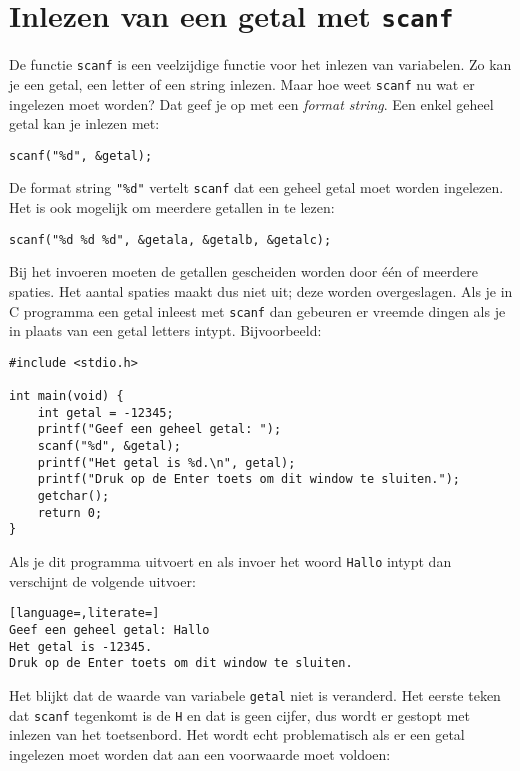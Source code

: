 \documentclass[a4paper,10pt,fleqn,twoside]{article}
\begin{document}
\section{Inlezen van een getal met \texttt{scanf}}
\label{sec:scanf}
De functie \lstinline|scanf| is een veelzijdige functie voor het inlezen van variabelen. Zo kan je een getal, een letter of een string inlezen. Maar hoe weet \lstinline|scanf| nu wat er ingelezen moet worden? Dat geef je op met een \textsl{format string}. Een enkel geheel getal kan je inlezen met:

\begin{lstlisting}
scanf("%d", &getal);
\end{lstlisting}

De format string \lstinline|"%d"| vertelt \lstinline|scanf| dat een geheel getal moet worden ingelezen. Het is ook mogelijk om meerdere getallen in te lezen:

\begin{lstlisting}
scanf("%d %d %d", &getala, &getalb, &getalc);
\end{lstlisting}

Bij het invoeren moeten de getallen gescheiden worden door één of meerdere spaties. Het aantal spaties maakt dus niet uit; deze worden overgeslagen. Als je in C programma een getal inleest met \lstinline|scanf| dan gebeuren er vreemde dingen als je in plaats van een getal letters intypt. Bijvoorbeeld:

\begin{lstlisting}
#include <stdio.h>

int main(void) {
    int getal = -12345;
    printf("Geef een geheel getal: ");
    scanf("%d", &getal);
    printf("Het getal is %d.\n", getal);
    printf("Druk op de Enter toets om dit window te sluiten.");
    getchar();
    return 0;
}
\end{lstlisting}

Als je dit programma uitvoert en als invoer het woord \lstinline|Hallo| intypt dan verschijnt de volgende uitvoer:

\begin{lstlisting}[language=,literate=]
Geef een geheel getal: Hallo
Het getal is -12345.
Druk op de Enter toets om dit window te sluiten.
\end{lstlisting}

Het blijkt dat de waarde van variabele \lstinline|getal| niet is veranderd. Het eerste teken dat \lstinline|scanf| tegenkomt is de \lstinline|H| en dat is geen cijfer, dus wordt er gestopt met inlezen van het toetsenbord. Het wordt echt problematisch als er een getal ingelezen moet worden dat aan een voorwaarde moet voldoen:
\end{document}
